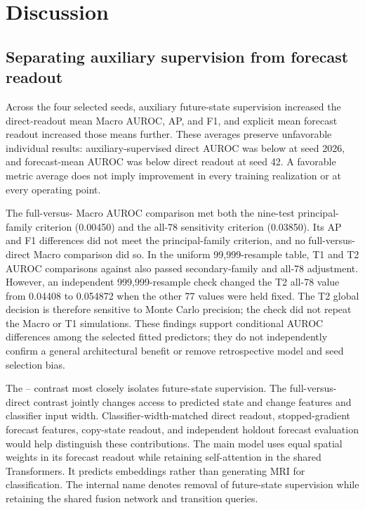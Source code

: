 \section{Discussion}
\label{sec:discussion}
\subsection{Separating auxiliary supervision from forecast readout}
Across the four selected seeds, auxiliary future-state supervision increased the direct-readout mean Macro AUROC, AP, and F1, and explicit mean forecast readout increased those means further. These averages preserve unfavorable individual results: auxiliary-supervised direct AUROC was below \nojepa{} at seed 2026, and forecast-mean AUROC was below direct readout at seed 42. A favorable metric average does not imply improvement in every training realization or at every operating point.

The full-versus-\nojepa{} Macro AUROC comparison met both the nine-test principal-family criterion (0.00450) and the all-78 sensitivity criterion (0.03850). Its AP and F1 differences did not meet the principal-family criterion, and no full-versus-direct Macro comparison did so. In the uniform 99,999-resample table, T1 and T2 AUROC comparisons against \nojepa{} also passed secondary-family and all-78 adjustment. However, an independent 999,999-resample check changed the T2 all-78 value from 0.04408 to 0.054872 when the other 77 values were held fixed. The T2 global decision is therefore sensitive to Monte Carlo precision; the check did not repeat the Macro or T1 simulations. These findings support conditional AUROC differences among the selected fitted predictors; they do not independently confirm a general architectural benefit or remove retrospective model and seed selection bias.

The \direct{}--\nojepa{} contrast most closely isolates future-state supervision. The full-versus-direct contrast jointly changes access to predicted state and change features and classifier input width. Classifier-width-matched direct readout, stopped-gradient forecast features, copy-state readout, and independent holdout forecast evaluation would help distinguish these contributions. The main model uses equal spatial weights in its forecast readout while retaining self-attention in the shared Transformers. It predicts embeddings rather than generating MRI for classification. The internal name \nojepa{} denotes removal of future-state supervision while retaining the shared fusion network and transition queries.

